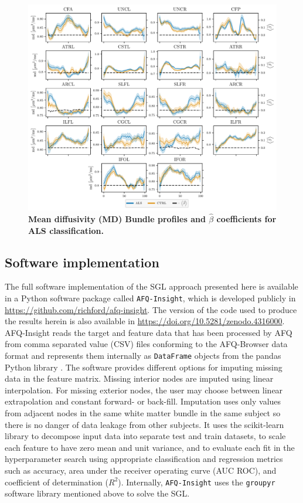 \documentclass[10pt,%
               aps,%
               prl,%
               reprint,%
               superscriptaddress,%
               preprintnumbers,%
               linenumbers,%
               amsmath,%
               floatfix]{revtex4-2}
\begin{document}
\begin{figure}
    \includegraphics[width=\textwidth]{sarica_coefs_profiles_md.pdf}
    \caption{%
        {%
            \bf Mean diffusivity (MD) Bundle profiles and $\hat{\beta}$
            coefficients for ALS classification.
        }
        \label{fig:als-bp:md}
    }
\end{figure}

\subsection{Software implementation}

The full software implementation of the SGL approach presented here is available
in a Python software package called \texttt{AFQ-Insight}, which is developed
publicly in \url{https://github.com/richford/afq-insight}.
The version of the code used to produce the results herein is also available in
\url{https://doi.org/10.5281/zenodo.4316000}.
AFQ-Insight reads the target and feature data that has been processed by AFQ
from comma separated value (CSV) files conforming to the AFQ-Browser data
format \cite{yeatman2018browser} and represents them internally as
\lstinline{DataFrame} objects from the pandas Python library
\cite{mckinney2010data}. The software provides different options for imputing
missing data in the feature matrix. Missing interior nodes are imputed using
linear interpolation. For missing exterior nodes, the user may choose between
linear extrapolation and constant forward- or back-fill. Imputation uses only
values from adjacent nodes in the same white matter bundle in the same
subject so there is no danger of data leakage from other subjects. It uses
the scikit-learn \cite{scikit-learn} library to decompose input data into
separate test and train datasets, to scale each feature to have zero mean and
unit variance, and to evaluate each fit in the hyperparameter search using
appropriate classification and regression metrics such as accuracy, area
under the receiver operating curve (AUC ROC), and coefficient of
determination ($R^2$). Internally, \texttt{AFQ-Insight} uses the \texttt{groupyr} software library \cite{groupyr} mentioned above to solve the SGL.
\end{document}
